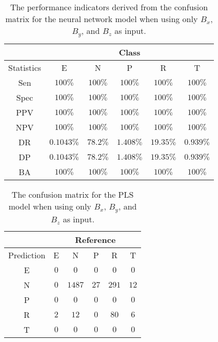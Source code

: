 \begin{table}[!ht]
	\centering
	\begin{tabular}{|c|c|c|c|c|c|}
		\hline
		 & \multicolumn{5}{c|}{Class} \\ \hline
		Statistics & E & N & P & R & T \\ \hline
		Sen & $100\%$ & $100\%$ & $100\%$ & $100\%$ & $100\%$ \\ \hline
		Spec & $100\%$ & $100\%$ & $100\%$ & $100\%$ & $100\%$ \\ \hline
		PPV & $100\%$ & $100\%$ & $100\%$ & $100\%$ & $100\%$ \\ \hline
		NPV & $100\%$ & $100\%$ & $100\%$ & $100\%$ & $100\%$ \\ \hline
		DR & $0.1043\%$ & $78.2\%$ & $1.408\%$ & $19.35\%$ & $0.939\%$ \\ \hline
		DP & $0.1043\%$ & $78.2\%$ & $1.408\%$ & $19.35\%$ & $0.939\%$ \\ \hline
		BA & $100\%$ & $100\%$ & $100\%$ & $100\%$ & $100\%$ \\ \hline
	\end{tabular}
	\caption{The performance indicators derived from the confusion matrix for the neural network model when using only $B_{x}$, $B_{y}$, and $B_{z}$ as input.}
	\label{tab:cs:reverse:coord:nnet}
\end{table}

\begin{table}[!ht]
	\centering
	\begin{tabular}{|c|c|c|c|c|c|}
		\hline
		 & \multicolumn{5}{|c|}{Reference} \\ \hline
		 Prediction & E & N & P & R & T \\ \hline
		 E & $0$ & $0$ & $0$ & $0$ & $0$ \\ \hline
		 N & $0$ & $1487$ & $27$ & $291$ & $12$ \\ \hline
		 P & $0$ & $0$ & $0$ & $0$ & $0$ \\ \hline
		 R & $2$ & $12$ & $0$ & $80$ & $6$ \\ \hline
		 T & $0$ & $0$ & $0$ & $0$ & $0$ \\ \hline
	\end{tabular}
	\caption{The confusion matrix for the PLS model when using only $B_{x}$, $B_{y}$, and $B_{z}$ as input.}
	\label{tab:cm:coord:pls}
\end{table}

